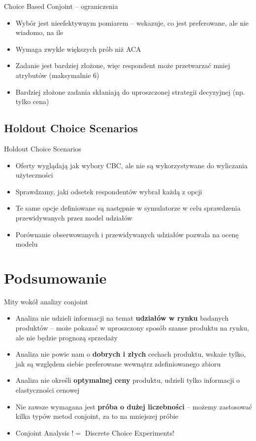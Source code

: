 \documentclass{beamer}
\begin{document}
\begin{frame}{Choice Based Conjoint -- ograniczenia}
  \begin{itemize}
  \item Wybór jest nieefektywnym pomiarem -- wskazuje, co jest preferowane, ale nie wiadomo, na ile
  \item Wymaga zwykle większych prób niż ACA
  \item Zadanie jest bardziej złożone, więc respondent może przetwarzać mniej atrybutów (maksymalnie 6)
  \item Bardziej złożone zadania skłaniają do uproszczonej strategii decyzyjnej (np. tylko cena)
  \end{itemize}
\end{frame}

\subsection{Holdout Choice Scenarios}
\begin{frame}{Holdout Choice Scenarios}
  \begin{itemize}
  \item Oferty wyglądają jak wybory CBC, ale nie są wykorzystywane do wyliczania użyteczności
  \item Sprawdzamy, jaki odsetek respondentów wybrał każdą z opcji
  \item Te same opcje definiowane są następnie w symulatorze w celu sprawdzenia przewidywanych przez model udziałów
  \item Porównanie obserwowanych i przewidywanych udziałów pozwala na ocenę modelu
  \end{itemize}
\end{frame}

\section{Podsumowanie}
\begin{frame}{Mity wokół analizy conjoint}
  \begin{itemize}
  \item Analiza nie udzieli informacji na temat \textbf{udziałów w rynku} badanych produktów -- może pokazać w uproszczony sposób szanse produktu na rynku, ale nie będzie prognozą sprzedaży
  \item Analiza nie powie nam o \textbf{dobrych i złych} cechach produktu, wskaże tylko, jak są względem siebie preferowane wewnątrz zdefiniowanego zbioru
  \item Analiza nie określi \textbf{optymalnej ceny} produktu, udzieli tylko informacji o elastyczności cenowej
  \item Nie zawsze wymagana jest \textbf{próba o dużej liczebności} -- możemy zastosować kilka typów metod conjoint, za to na mniejszej próbie
  \item Conjoint Analysis !$=$ Discrete Choice Experiments!  
  \end{itemize}
\end{frame}
\end{document}
